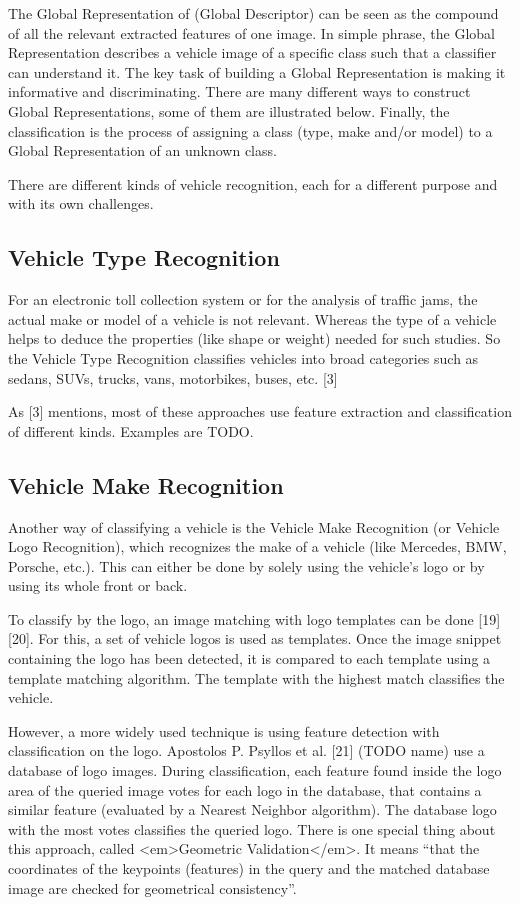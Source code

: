 The Global Representation of (Global Descriptor) can be seen as the compound of all the relevant extracted features of one image. In simple phrase, the Global Representation describes a vehicle image of a specific class such that a classifier can understand it. The key task of building a Global Representation is making it informative and discriminating. There are many different ways to construct Global Representations, some of them are illustrated below.
Finally, the classification is the process of assigning a class (type, make and/or model) to a Global Representation of an unknown class.

There are different kinds of vehicle recognition, each for a different purpose and with its own challenges.

\subsection{Vehicle Type Recognition}
For an electronic toll collection system or for the analysis of traffic jams, the actual make or model of a vehicle is not relevant. Whereas the type of a vehicle helps to deduce the properties (like shape or weight) needed for such studies. So the Vehicle Type Recognition classifies vehicles into broad categories such as sedans, SUVs, trucks, vans, motorbikes, buses, etc. [3]

As [3] mentions, most of these approaches use feature extraction and classification of different kinds. Examples are TODO.

\subsection{Vehicle Make Recognition}
Another way of classifying a vehicle is the Vehicle Make Recognition (or Vehicle Logo Recognition), which recognizes the make of a vehicle (like Mercedes, BMW, Porsche, etc.). This can either be done by solely using the vehicle’s logo or by using its whole front or back.

To classify by the logo, an image matching with logo templates can be done [19] [20]. For this, a set of vehicle logos is used as templates. Once the image snippet containing the logo has been detected, it is compared to each template using a template matching algorithm. The template with the highest match classifies the vehicle.

However, a more widely used technique is using feature detection with classification on the logo. Apostolos P. Psyllos et al. [21] (TODO name) use a database of logo images. During classification, each feature found inside the logo area of the queried image votes for each logo in the database, that contains a similar feature (evaluated by a Nearest Neighbor algorithm). The database logo with the most votes classifies the queried logo. There is one special thing about this approach, called <em>Geometric Validation</em>. It means “that the coordinates of the keypoints (features) in the query and the matched database image are checked for geometrical consistency”.

